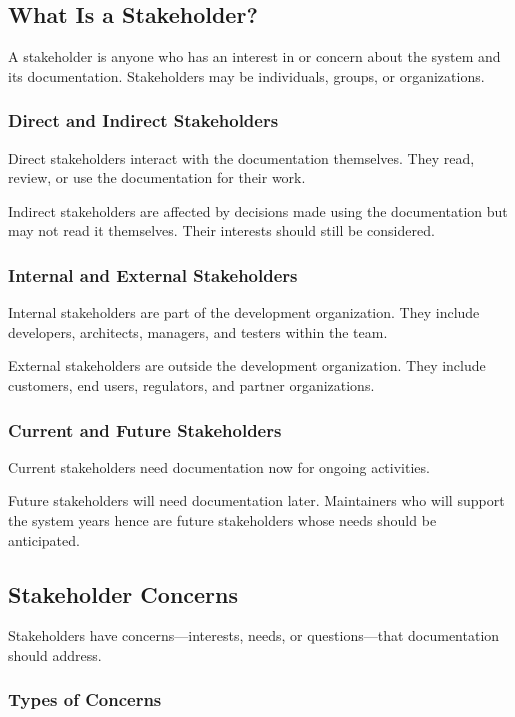 \documentclass[11pt]{article}
\begin{document}
\subsection{What Is a Stakeholder?}

A stakeholder is anyone who has an interest in or concern about the system and its documentation. Stakeholders may be individuals, groups, or organizations.

\subsubsection{Direct and Indirect Stakeholders}

Direct stakeholders interact with the documentation themselves. They read, review, or use the documentation for their work.

Indirect stakeholders are affected by decisions made using the documentation but may not read it themselves. Their interests should still be considered.

\subsubsection{Internal and External Stakeholders}

Internal stakeholders are part of the development organization. They include developers, architects, managers, and testers within the team.

External stakeholders are outside the development organization. They include customers, end users, regulators, and partner organizations.

\subsubsection{Current and Future Stakeholders}

Current stakeholders need documentation now for ongoing activities.

Future stakeholders will need documentation later. Maintainers who will support the system years hence are future stakeholders whose needs should be anticipated.

\subsection{Stakeholder Concerns}

Stakeholders have concerns---interests, needs, or questions---that documentation should address.

\subsubsection{Types of Concerns}
\end{document}
